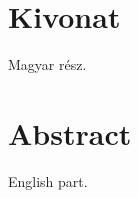 \setcounter{page}{1}
\selecthungarian

\section*{Kivonat}

Magyar rész.


\newpage
\selectenglish
\section*{Abstract}

English part.


\vfill
\selectthesislanguage

